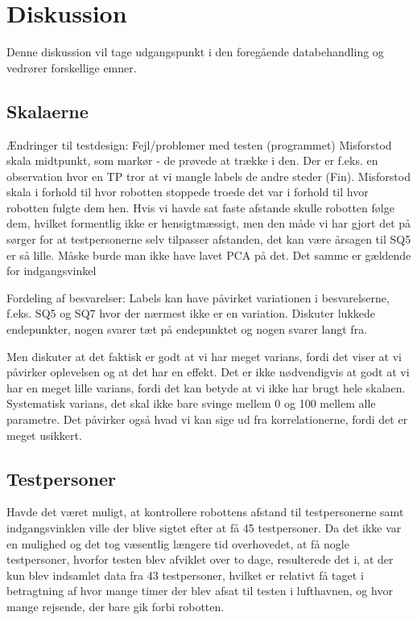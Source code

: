 \chapter{Diskussion}
\label{TestAfSkalaDiskussion}
%
Denne diskussion vil tage udgangspunkt i den foregående databehandling og vedrører forskellige emner.  

\section{Skalaerne}
\label{DiskussionSkala}
%
Ændringer til testdesign: Fejl/problemer med testen (programmet)
Misforstod skala midtpunkt, som markør - de prøvede at trække i den. Der er f.eks. en observation hvor en TP tror at vi mangle labels de andre steder (Fin). Misforstod skala i forhold til hvor robotten stoppede troede det var i forhold til hvor robotten fulgte dem hen. Hvis vi havde sat faste afstande skulle robotten følge dem, hvilket formentlig ikke er hensigtmæssigt, men den måde vi har gjort det på sørger for at testpersonerne selv tilpasser afstanden, det kan være årsagen til SQ5 er så lille. Måske burde man ikke have lavet PCA på det. Det samme er gældende for indgangsvinkel    

Fordeling af besvarelser: Labels kan have påvirket variationen i besvarelserne, f.eks. SQ5 og SQ7 hvor der nærmest ikke er en variation. Diskuter lukkede endepunkter, nogen svarer tæt på endepunktet og nogen svarer langt fra. 

Men diskuter at det faktisk er godt at vi har meget varians, fordi det viser at vi påvirker oplevelsen og at det har en effekt. Det er ikke nødvendigvis at godt at vi har en meget lille varians, fordi det kan betyde at vi ikke har brugt hele skalaen. Systematisk varians, det skal ikke bare svinge mellem 0 og 100 mellem alle parametre. Det påvirker også hvad vi kan sige ud fra korrelationerne, fordi det er meget usikkert. 

\section{Testpersoner}
\label{DiskussionTestpersoner}
%
Havde det været muligt, at kontrollere robottens afstand til testpersonerne samt indgangsvinklen ville der blive sigtet efter at få 45 testpersoner. Da det ikke var en mulighed og det tog væsentlig længere tid overhovedet, at få nogle testpersoner, hvorfor testen blev afviklet over to dage, resulterede det i, at der kun blev indsamlet data fra 43 testpersoner, hvilket er relativt få taget i betragtning af hvor mange timer der blev afsat til testen i lufthavnen, og hvor mange rejsende, der bare gik forbi robotten.

